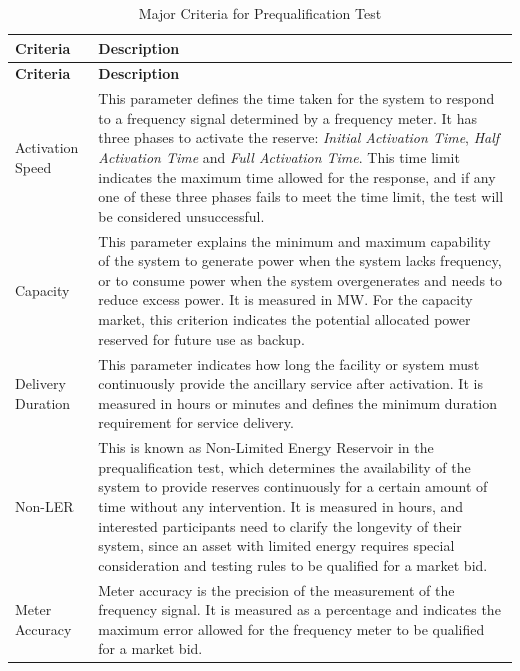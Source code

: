 \begin{longtable}{|p{3cm}|p{12cm}|}
    \caption{Major Criteria for Prequalification Test}\label{tab:criteria1}\\
    \hline
    \textbf{Criteria} & \textbf{Description} \\
    \hline
    \endfirsthead

    \hline
    \textbf{Criteria} & \textbf{Description} \\
    \hline
    \endhead

    \hline
    \endfoot

    \hline
    \endlastfoot

    Activation Speed & This parameter defines the time taken for the system to respond to a frequency signal determined by a frequency meter. It has three phases to activate the reserve: \textit{Initial Activation Time}, \textit{Half Activation Time} and \textit{Full Activation Time}. This time limit indicates the maximum time allowed for the response, and if any one of these three phases fails to meet the time limit, the test will be considered unsuccessful. \\
    \hline
    Capacity & This parameter explains the minimum and maximum capability of the system to generate power when the system lacks frequency, or to consume power when the system overgenerates and needs to reduce excess power. It is measured in MW. For the capacity market, this criterion indicates the potential allocated power reserved for future use as backup. \\
    \hline
    Delivery Duration & This parameter indicates how long the facility or system must continuously provide the ancillary service after activation. It is measured in hours or minutes and defines the minimum duration requirement for service delivery. \\
    \hline
    Non-LER & This is known as Non-Limited Energy Reservoir in the prequalification test, which determines the availability of the system to provide reserves continuously for a certain amount of time without any intervention. It is measured in hours, and interested participants need to clarify the longevity of their system, since an asset with limited energy requires special consideration and testing rules to be qualified for a market bid. \\
    \hline
    Meter Accuracy & Meter accuracy is the precision of the measurement of the frequency signal. It is measured as a percentage and indicates the maximum error allowed for the frequency meter to be qualified for a market bid. \\

\end{longtable}
